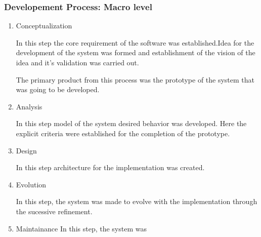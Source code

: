\documentclass[a4paper,12pt,onepage]{article}
\begin{document}
\subsubsection{Developement Process: Macro level}
\begin{enumerate}
\item Conceptualization
\par
In this step the core requirement of the software was established.Idea for the development of the system was formed and establishment of the vision of the idea and it's validation was carried out.
\par
The primary product from this process was the prototype of the system that was going to be developed.


\newpage
\item Analysis
\par
In this step model of the system desired behavior was developed. Here the explicit criteria were established for the completion of the prototype.

\newpage
\item Design
\par
In this step architecture for the implementation was created.
\newpage
\item Evolution
\par
In this step, the system was made to evolve with the implementation through
the sucessive refinement.
\newpage
\item Maintainance
In this step, the system was 
\newpage
\end{enumerate}
\end{document}
